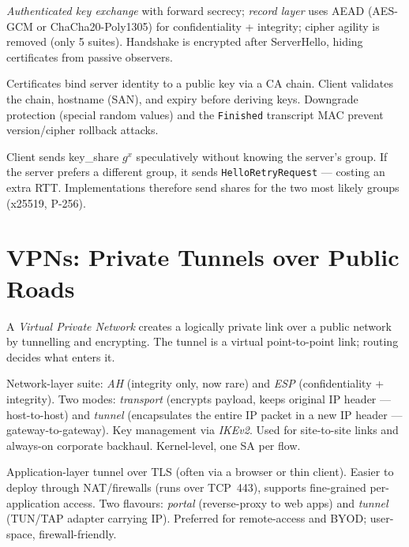 \begin{definition}
\emph{Authenticated key exchange} with forward secrecy; \emph{record layer} uses AEAD (AES-GCM or ChaCha20-Poly1305) for confidentiality + integrity; cipher agility is removed (only 5 suites). Handshake is encrypted after ServerHello, hiding certificates from passive observers.
\end{definition}

Certificates bind server identity to a public key via a CA chain. Client validates the chain, hostname (SAN), and expiry before deriving keys. Downgrade protection (special random values) and the \texttt{Finished} transcript MAC prevent version/cipher rollback attacks.

\begin{example}
Client sends key\_share $g^x$ speculatively without knowing the server's group. If the server prefers a different group, it sends \texttt{HelloRetryRequest} --- costing an extra RTT. Implementations therefore send shares for the two most likely groups (x25519, P-256).
\end{example}

\section{VPNs: Private Tunnels over Public Roads}
\label{sec:vpns}
A \emph{Virtual Private Network} creates a logically private link over a public network by tunnelling and encrypting. The tunnel is a virtual point-to-point link; routing decides what enters it.

\begin{description}[leftmargin=1.2em, itemsep=0.35em]
    \item[IPSec] Network-layer suite: \emph{AH} (integrity only, now rare) and \emph{ESP} (confidentiality + integrity). Two modes: \emph{transport} (encrypts payload, keeps original IP header --- host-to-host) and \emph{tunnel} (encapsulates the entire IP packet in a new IP header --- gateway-to-gateway). Key management via \emph{IKEv2}. Used for site-to-site links and always-on corporate backhaul. Kernel-level, one SA per flow.
    \item[SSL/TLS VPN] Application-layer tunnel over TLS (often via a browser or thin client). Easier to deploy through NAT/firewalls (runs over TCP~443), supports fine-grained per-application access. Two flavours: \emph{portal} (reverse-proxy to web apps) and \emph{tunnel} (TUN/TAP adapter carrying IP). Preferred for remote-access and BYOD; user-space, firewall-friendly.
\end{description}

